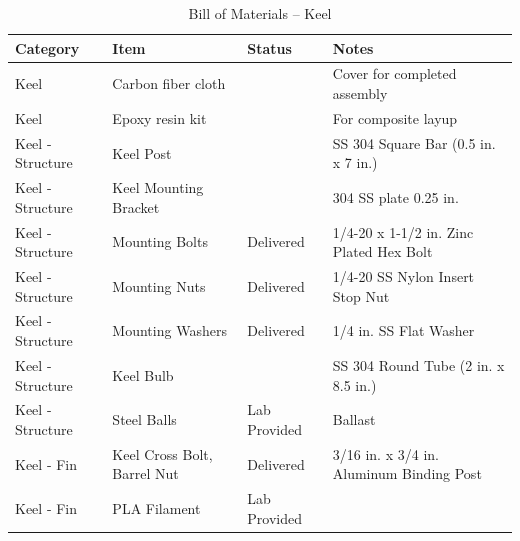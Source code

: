 \begin{table}[htbp]
\label{tab:bom_keel}
\centering
\caption{Bill of Materials -- Keel}
\footnotesize
\begin{tabular}{|p{3.45cm}|p{5.5cm}|p{2.2cm}|p{4.75cm}|}
\hline
\textbf{Category} & \textbf{Item} & \textbf{Status} & \textbf{Notes} \\
\hline
Keel & Carbon fiber cloth & & Cover for completed assembly \\
\hline
Keel & Epoxy resin kit & & For composite layup \\
\hline
Keel - Structure & Keel Post & & SS 304 Square Bar (0.5 in. x 7 in.) \\
\hline
Keel - Structure & Keel Mounting Bracket & & 304 SS plate 0.25 in. \\
\hline
Keel - Structure & Mounting Bolts & Delivered & 1/4-20 x 1-1/2 in. Zinc Plated Hex Bolt \\
\hline
Keel - Structure & Mounting Nuts & Delivered & 1/4-20 SS Nylon Insert Stop Nut \\
\hline
Keel - Structure & Mounting Washers & Delivered & 1/4 in. SS Flat Washer \\
\hline
Keel - Structure & Keel Bulb & & SS 304 Round Tube (2 in. x 8.5 in.) \\
\hline
Keel - Structure & Steel Balls & Lab Provided & Ballast \\
\hline
Keel - Fin & Keel Cross Bolt, Barrel Nut & Delivered & 3/16 in. x 3/4 in. Aluminum Binding Post \\
\hline
Keel - Fin & PLA Filament & Lab Provided & \\
\hline
\end{tabular}
\end{table}

